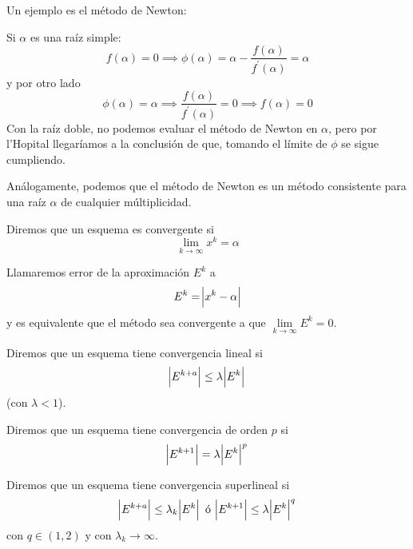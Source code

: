 \begin{ej}
    Un ejemplo es el método de Newton:

    Si $\alpha$ es una raíz simple:
    \[
        f(\alpha) = 0 \implies \phi(\alpha) = \alpha - \frac{f(\alpha)}{f^\prime(\alpha)} = \alpha
    \]
    y por otro lado
    \[
        \phi(\alpha) = \alpha \implies \frac{f(\alpha)}{f^\prime(\alpha)} = 0 \implies f(\alpha) = 0
    \]
    Con la raíz doble, no podemos evaluar el método de Newton en $\alpha$, pero por l'Hopital llegaríamos
    a la conclusión de que, tomando el límite de $\phi$ se sigue cumpliendo.

    Análogamente, podemos que el método de Newton es un método consistente para una raíz $\alpha$ de
    cualquier múltiplicidad.
\end{ej}

\begin{defi}
    Diremos que un esquema es convergente si
    \[
        \lim_{k \to \infty} x^k = \alpha
    \]
\end{defi}

\begin{obs}
    Llamaremos error de la aproximación $E^k$ a 
    \[
        E^k = \abs{x^k - \alpha}
    \]
    y es equivalente que el método sea convergente a que $\lim\limits_{k \to \infty} E^k = 0$.
\end{obs}

\begin{defi}
    Diremos que un esquema tiene convergencia lineal si
    \[
        \abs{E^{k+a}} \leq \lambda \abs{E^k}
    \]
    (con $\lambda < 1$).
\end{defi}

\begin{defi}
    Diremos que un esquema tiene convergencia de orden $p$ si
    \[
        \abs{E^{k+1}} = \lambda \abs{E^k}^p
    \]
\end{defi}

\begin{defi}
    Diremos que un esquema tiene convergencia superlineal si
    \[
        \abs{E^{k+a}} \leq \lambda_k \abs{E^k} \text{ ó }
        \abs{E^{k+1}} \leq \lambda \abs{E^k}^q
    \]
    con $q \in (1, 2)$ y con $\lambda_k \to \infty$.
\end{defi}
